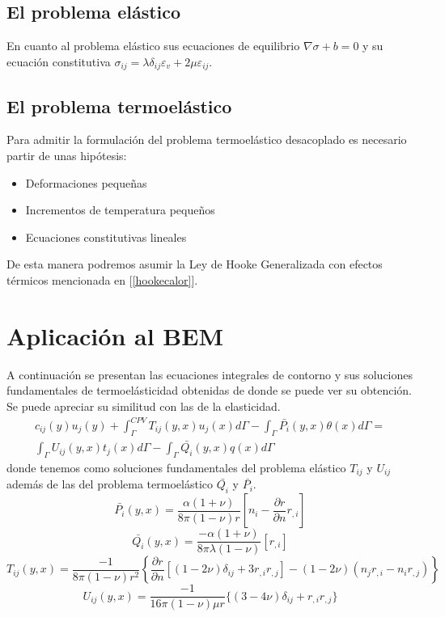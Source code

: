\documentclass[11pt,a4paper]{article}
\begin{document}
\subsection{El problema elástico}
En cuanto al problema elástico sus ecuaciones de equilibrio $\nabla \sigma +b =0$ y su ecuación constitutiva $\sigma_{ij}=\lambda \delta_{ij} \varepsilon_{v} + 2 \mu \varepsilon_{ij}$.
\subsection{El problema termoelástico}
Para admitir la formulación del problema termoelástico desacoplado es necesario partir de unas hipótesis: \begin{itemize}
\item Deformaciones pequeñas
\item Incrementos de temperatura pequeños
\item Ecuaciones constitutivas lineales
\end{itemize}
De esta manera podremos asumir la Ley de Hooke Generalizada con efectos térmicos mencionada en [\ref{hookecalor}].
\section{Aplicación al BEM}
A continuación se presentan las ecuaciones integrales de contorno y sus soluciones fundamentales de termoelásticidad obtenidas de \cite{Bal} donde se puede ver su obtención. Se puede apreciar su similitud con las de la elasticidad.
\begin{equation}
\begin{aligned}
c_{ij}(y)u_{j}(y)+\int_{\Gamma}^{CPV} T_{ij}(y,x)u_{j}(x) d \Gamma - \int_{\Gamma} \bar{P_{i}}(y,x)\theta(x) d\Gamma = \\ \int_{\Gamma} U_{ij}(y,x)t_{j}(x) d\Gamma -\int_{\Gamma} \bar{Q_{i}}(y,x)q(x)d\Gamma
\end{aligned}
\end{equation}
donde tenemos como soluciones fundamentales del problema elástico $T_{ij}$ y $U_{ij}$ además de las del problema termoelástico $\bar{Q_{i}}$ y $ \bar{P_{i}}$.
\vspace{0.5cm}
\begin{equation}
\bar{P_{i}}(y,x)=\frac{\alpha(1+\nu)}{8\pi(1-\nu)r}[n_i-\frac{\partial{r}}{\partial{n}}r_{,i}]
\end{equation}
\begin{equation}
\bar{Q_{i}}(y,x)=\frac{-\alpha(1+\nu)}{8\pi\lambda(1-\nu)}[r_{,i}]
\end{equation}
\begin{equation}
T_{ij}(y,x)=\frac{-1}{8\pi(1-\nu)r^2} \left\{\frac{\partial{r}}{\partial{n}}[(1-2\nu)\delta_{ij}+3r_{,i}r_{,j}]-(1-2\nu)(n_j r_{,i}-n_i r_{,j}) \right\}
\end{equation}
\begin{equation}
U_{ij}(y,x)=\frac{-1}{16\pi(1-\nu)\mu r} \{ (3-4\nu) \delta_{ij} + r_{,i} r_{,j}\}
\end{equation}
\end{document}
